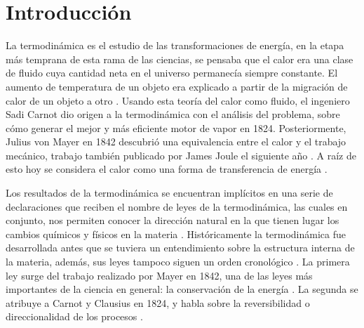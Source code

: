 
%


\newcommand{\keyword}[1]{\textit{#1}}


\section{Introducción}
	La termodinámica es el estudio de las transformaciones de energía, en la etapa más temprana de esta rama de las ciencias, se pensaba que el calor era una clase de fluido cuya cantidad neta en el universo permanecía siempre constante. El aumento de temperatura de un objeto era explicado a partir de la migración de calor de un objeto a otro \cite{feynman2011feynman, fermi1986}. Usando esta teoría del calor como fluido, el ingeniero Sadi Carnot dio origen a la termodinámica con el análisis del problema, sobre cómo generar el mejor y más eficiente motor de vapor en 1824. Posteriormente, Julius von Mayer en 1842 descubrió una equivalencia entre el calor y el trabajo mecánico, trabajo también publicado por James Joule el siguiente año \cite{fermi1986}. A raíz de esto hoy se considera el calor como una forma de transferencia de energía \cite{fermi1986}.
	
	Los resultados de la termodinámica se encuentran implícitos en una serie de declaraciones que reciben el nombre de leyes de la termodinámica, las cuales en conjunto, nos permiten conocer la dirección natural en la que tienen lugar los cambios químicos y físicos en la materia \cite{atkins2011physical}. Históricamente la termodinámica fue desarrollada antes que se tuviera un entendimiento sobre la estructura interna de la materia, además, sus leyes tampoco siguen un orden cronológico \cite{feynman2011feynman}. La primera ley surge del trabajo realizado por Mayer en 1842, una de las leyes más importantes de la ciencia en general: la conservación de la energía \cite{feynman2011feynman, fermi1986}. La segunda se atribuye a Carnot y Clausius en 1824, y habla sobre la reversibilidad o direccionalidad de los procesos \cite{feynman2011feynman}.
	
